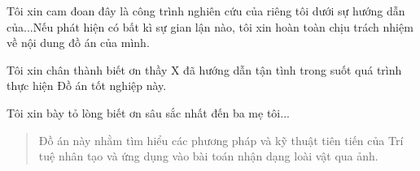 

\thesislayout



\coverpage

\frontmatter

\begin{declaration}
Tôi xin cam đoan đây là công trình nghiên cứu của riêng tôi dưới sự hướng dẫn của...Nếu phát hiện có bất kì sự gian lận nào, tôi xin hoàn toàn chịu trách nhiệm về nội dung đồ án của mình.
\end{declaration}

\newpage

\begin{acknowledgments}
Tôi xin chân thành biết ơn thầy X đã hướng dẫn tận tình trong suốt quá trình thực hiện Đồ án tốt nghiệp này.


Tôi xin bày tỏ lòng biết ơn sâu sắc nhất đến ba mẹ tôi...

\end{acknowledgments}

\begin{abstract}
Đồ án này nhằm tìm hiểu các phương pháp và kỹ thuật tiên tiến của Trí tuệ nhân tạo và ứng dụng vào bài toán nhận dạng loài vật qua ảnh.
\end{abstract}	

\tableofcontents
\listoftables
\listoffigures
\listofalgorithms

\mainmatter
\fancyhead{}  %
\renewcommand{\footrulewidth}{0.4pt}
\pagestyle{fancy} 
\renewcommand{\chaptermark}[1]{\markboth{#1}{#1}}
\fancyhead[R]{\chaptername\ \thechapter\ --\ \leftmark}







 


